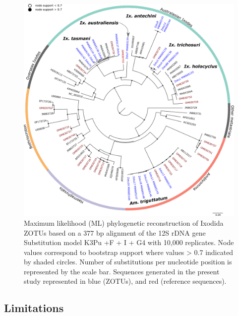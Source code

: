 \documentclass[a4paper, nobind]{templates/ociamthesis}
\begin{document}
\begin{figure}
\includegraphics[width=0.95\linewidth]{figures/ms-figs/Ch2-12SNGStree} \caption[Phylogeny of tick species from wildlife.]{Maximum likelihood (ML) phylogenetic reconstruction of Ixodida ZOTUs based on a 377 bp alignment of the 12S rDNA gene Substitution model K3Pu +F + I + G4 with 10,000 replicates. Node values correspond to bootstrap support where values > 0.7 indicated by shaded circles. Number of substitutions per nucleotide position is represented by the scale bar. Sequences generated in the present study represented in blue (ZOTUs), and red (reference sequences).}\label{fig:F2NGStree}
\end{figure}

\hypertarget{limitations}{%
\subsection{Limitations}\label{limitations}}
\end{document}

